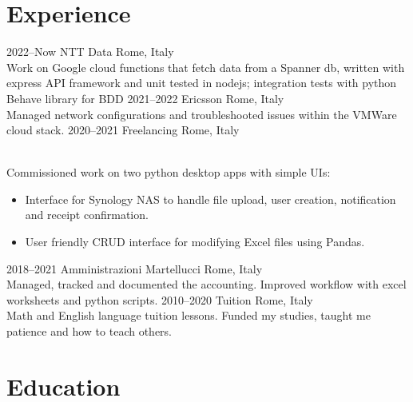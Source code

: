 \documentclass[]{cv-style}          %
\begin{document}
\section{Experience}

\begin{entrylist}
\entry
{2022--Now}
{NTT Data}
{Rome, Italy}
{\\
Work on Google cloud functions that fetch data from a Spanner db, written with express API framework and unit tested in nodejs; integration tests with python Behave library for BDD
}
\entry
{2021--2022}
{Ericsson}
{Rome, Italy}
{\\
Managed network configurations and troubleshooted issues within the VMWare cloud stack.}
\entry 
  {2020--2021}
  {Freelancing}
  {Rome, Italy}
  {\\
  Commissioned work on two python desktop apps with simple UIs:
  \begin{itemize}
      \item Interface for Synology NAS to handle file upload, user creation, notification and receipt confirmation.
      \item User friendly CRUD interface for modifying Excel files using Pandas.
  \end{itemize}
}
\entry
  {2018--2021}
  {Amministrazioni Martellucci}
  {Rome, Italy}
  {\\
  Managed, tracked and documented the accounting. Improved workflow with excel worksheets and python scripts.
  }
\entry
  {2010--2020}
  {Tuition}
  {Rome, Italy}
  {\\
    Math and English language tuition lessons. Funded my studies, taught me patience and how to teach others.
  }
\end{entrylist}


\section{Education}
\end{document}
